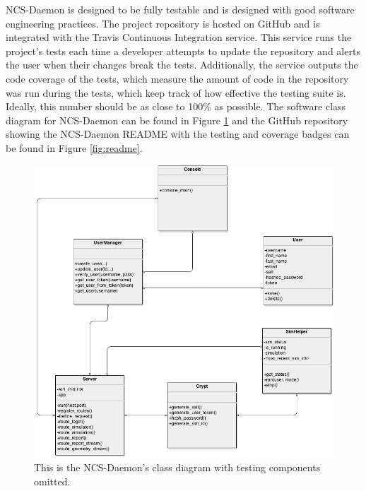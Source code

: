 NCS-Daemon is designed to be fully testable and is designed with good software engineering practices. The project repository is hosted on GitHub and is integrated with the Travis Continuous Integration service. This service runs the project's tests each time a developer attempts to update the repository and alerts the user when their changes break the tests. Additionally, the service outputs the code coverage of the tests, which measure the amount of code in the repository was run during the tests, which keep track of how effective the testing suite is. Ideally, this number should be as close to 100\% as possible. The software class diagram for NCS-Daemon can be found in Figure \ref{fig:ncs_daemon_diagram} and the GitHub repository showing the NCS-Daemon README with the testing and coverage badges can be found in Figure \ref{fig:readme}.

\begin{figure}
\begin{center}
\includegraphics[height=\textheight,width=6in,keepaspectratio]{figures/ncs_daemon_diagram.png}
\caption[NCS-Daemon Class Diagram]{This is the NCS-Daemon's class diagram with testing components omitted.\label{fig:ncs_daemon_diagram}}
\end{center}
\end{figure}

